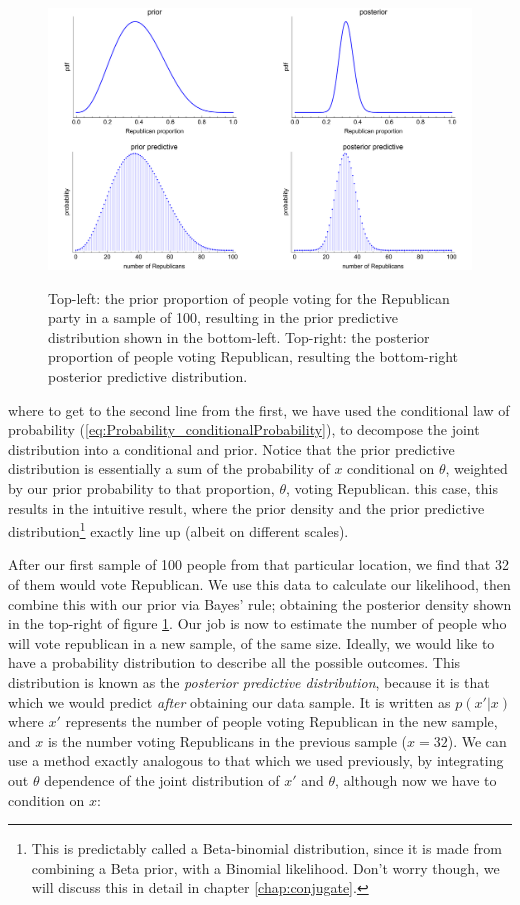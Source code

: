 \documentclass[11pt,fullpage]{book}
\begin{document}
\begin{figure}
\centering
\scalebox{0.4} 
{\includegraphics{Posterior_priorPosteriorPredictiveVoting.pdf}}
\caption{Top-left: the prior proportion of people voting for the Republican party in a sample of 100, resulting in the prior predictive distribution shown in the bottom-left. Top-right: the posterior proportion of people voting Republican, resulting the bottom-right posterior predictive distribution.}\label{fig:Posterior_priorPosteriorPredictiveVoting}
\end{figure}


where to get to the second line from the first, we have used the conditional law of probability (\ref{eq:Probability_conditionalProbability}), to decompose the joint distribution into a conditional and prior. Notice that the prior predictive distribution is essentially a sum of the probability of $x$ conditional on $\theta$, weighted by our prior probability to that proportion, $\theta$, voting Republican. this case, this results in the intuitive result, where the prior density and the prior predictive distribution\footnote{This is predictably called a Beta-binomial distribution, since it is made from combining a Beta prior, with a Binomial likelihood. Don't worry though, we will discuss this in detail in chapter \ref{chap:conjugate}.} exactly line up (albeit on different scales).

After our first sample of 100 people from that particular location, we find that 32 of them would vote Republican. We use this data to calculate our likelihood, then combine this with our prior via Bayes' rule; obtaining the posterior density shown in the top-right of figure \ref{fig:Posterior_priorPosteriorPredictiveVoting}. Our job is now to estimate the number of people who will vote republican in a new sample, of the same size. Ideally, we would like to have a probability distribution to describe all the possible outcomes. This distribution is known as the \textit{posterior predictive distribution}, because it is that which we would predict \textit{after} obtaining our data sample. It is written as $p(x'|x)$ where $x'$ represents the number of people voting Republican in the new sample, and $x$ is the number voting Republicans in the previous sample ($x=32$). We can use a method exactly analogous to that which we used previously, by integrating out $\theta$ dependence of the joint distribution of $x'$ and $\theta$, although now we have to condition on $x$:
\end{document}
